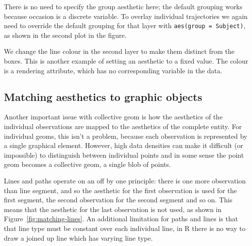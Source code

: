 \noindent There is no need to specify the group aesthetic here; the default grouping works because occasion is a discrete variable.  To overlay individual trajectories we again need to override the default grouping for that layer with {\tt aes(group = Subject)}, as shown in the second plot in the figure.

% 


We change the line colour in the second layer to make them distinct from the boxes.  This is another example of setting an aesthetic to a fixed value.  The colour is a rendering attribute, which has no corresponding variable in the data.

% 


\subsection{Matching aesthetics to graphic objects}
\label{sub:matching}

Another important issue with collective geom is how the aesthetics of the individual observations are mapped to the aesthetics of the complete entity.  For individual geoms, this isn't a problem, because each observation is represented by a single graphical element.  However, high data densities can make it difficult (or impossible) to distinguish between individual points and in some sense the point geom becomes a collective geom, a single blob of points.

Lines and paths operate on an off by one principle: there is one more observation than line segment, and so the aesthetic for the first observation is used for the first segment, the second observation for the second segment and so on.  This means that the aesthetic for the last observation is not used, as shown in Figure~\ref{fig:matching-lines}.  An additional limitation for paths and lines is that that line type must be constant over each individual line, in R there is no way to draw a joined up line which has varying line type.

